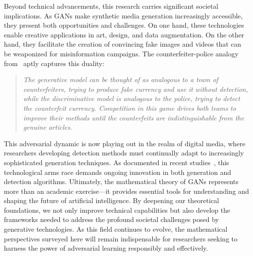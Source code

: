 Beyond technical advancements, this research carries significant societal implications. As GANs make synthetic media generation increasingly accessible, they present both opportunities and challenges. On one hand, these technologies enable creative applications in art, design, and data augmentation. On the other hand, they facilitate the creation of convincing fake images and videos that can be weaponized for misinformation campaigns. The counterfeiter-police analogy from~\cite{ref:goodfellow-original} aptly captures this duality:
\begin{quote}
    \itshape The generative model can be thought of as analogous to a team of counterfeiters, trying to produce fake currency and use it without detection, while the discriminative model is analogous to the police, trying to detect the counterfeit currency. Competition in this game drives both teams to improve their methods until the counterfeits are indistinguishable from the genuine articles.
\end{quote}
This adversarial dynamic is now playing out in the realm of digital media, where researchers developing detection methods must continually adapt to increasingly sophisticated generation techniques. As documented in recent studies~\cite{ref:df1,ref:df2,ref:df3,ref:df4,ref:df5,ref:df6,ref:df7,ref:df8,ref:df9,ref:df10,ref:df11,ref:df12}, this technological arms race demands ongoing innovation in both generation and detection algorithms.
Ultimately, the mathematical theory of GANs represents more than an academic exercise—it provides essential tools for understanding and shaping the future of artificial intelligence. By deepening our theoretical foundations, we not only improve technical capabilities but also develop the frameworks needed to address the profound societal challenges posed by generative technologies. As this field continues to evolve, the mathematical perspectives surveyed here will remain indispensable for researchers seeking to harness the power of adversarial learning responsibly and effectively.
